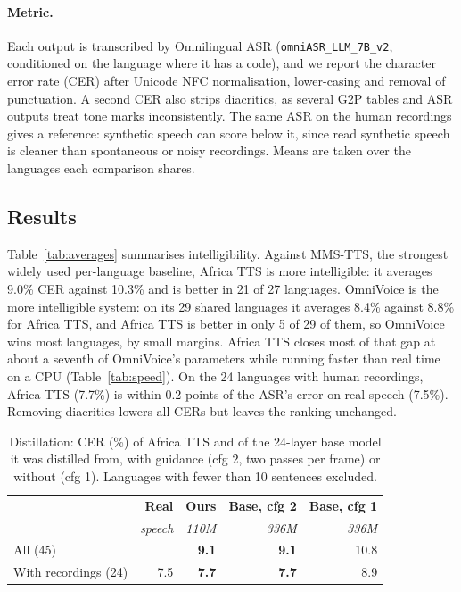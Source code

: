 \documentclass[10pt,twocolumn]{article}
\newcommand{\att}{Africa TTS}
\newcommand{\turboBeatsMms}{21 of 27}
\newcommand{\turboBeatsOmni}{5 of 29}
\newcommand{\avgMmsturbo}{9.0}
\newcommand{\avgMmsMms}{10.3}
\newcommand{\avgOmniturbo}{8.8}
\newcommand{\avgOmniOmni}{8.4}
\newcommand{\avgNOmni}{29}
\newcommand{\avgrealreal}{7.5}
\newcommand{\avgrealturbo}{7.7}
\newcommand{\avgNreal}{24}
\begin{document}
\paragraph{Metric.} Each output is transcribed by Omnilingual ASR (\texttt{omniASR\_LLM\_7B\_v2},
conditioned on the language where it has a code), and we report the character error rate (CER)
after Unicode NFC normalisation, lower-casing and removal of punctuation. A second CER also
strips diacritics, as several G2P tables and ASR outputs treat tone marks inconsistently. The
same ASR on the human recordings gives a reference: synthetic speech can score below it, since
read synthetic speech is cleaner than spontaneous or noisy recordings. Means are taken over the
languages each comparison shares.

\subsection{Results}
Table~\ref{tab:averages} summarises intelligibility. Against MMS-TTS, the strongest widely used
per-language baseline, \att{} is more intelligible: it averages \avgMmsturbo{}\% CER against
\avgMmsMms{}\% and is better in \turboBeatsMms{} languages. OmniVoice is the more intelligible
system: on its \avgNOmni{} shared languages it averages \avgOmniOmni{}\% against
\avgOmniturbo{}\% for \att{}, and \att{} is better in only \turboBeatsOmni{} of them, so OmniVoice
wins most languages, by small margins. \att{} closes most of that gap at about a seventh of
OmniVoice's parameters while running faster than real time on a CPU (Table~\ref{tab:speed}).
On the \avgNreal{} languages with human recordings, \att{} (\avgrealturbo{}\%) is within
0.2 points of the ASR's error on real speech (\avgrealreal{}\%). Removing diacritics lowers all
CERs but leaves the ranking unchanged.

\begin{table}[t]
\centering
\footnotesize
\setlength{\tabcolsep}{3.5pt}
\begin{tabular}{lrrrr}
\toprule
 & \textbf{Real} & \textbf{Ours} & \textbf{Base, cfg 2} & \textbf{Base, cfg 1} \\
 & \textit{speech} & \textit{110M} & \textit{336M} & \textit{336M} \\
\midrule
All (45) & & \textbf{9.1} & \textbf{9.1} & 10.8 \\
With recordings (24) & 7.5 & \textbf{7.7} & \textbf{7.7} & 8.9 \\
\bottomrule
\end{tabular}
\caption{Distillation: CER (\%) of \att{} and of the 24-layer base model it was distilled from, with guidance (cfg 2, two passes per frame) or without (cfg 1). Languages with fewer than 10 sentences excluded.}
\label{tab:distill}
\end{table}
\end{document}
